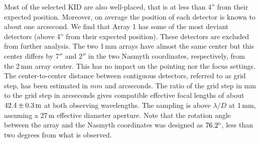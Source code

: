 Most of the selected KID are also well-placed, that is at less than 4'' from
their expected position. Moreover, on average the position of each
detector is known to about one arcsecond. We find
that Array 1 has some of the most deviant detectors (above 4''
from their expected position). These detectors are excluded from
further analysis. The two 1\,mm arrays have almost
the same center but this center differs by $7''$ and $2''$ in the two Nasmyth
coordinates, respectively, from the 2\,mm array center. This has no impact on the
pointing nor the focus settings. {\lp The center-to-center distance between
contiguous detectors, referred to as grid step, has been estimated in
$mm$ and arcseconds. The ratio of the grid step in mm to
the grid step in arcseconds gives compatible effective focal lengths
of about $42.4\pm0.3\,\rm{m}$ at both observing wavelengths.} The sampling is above $\lambda/D$ at
1\,mm, assuming a 27\,m effective diameter aperture. Note that
the rotation angle between the array and the Nasmyth
coordinates was designed as $76.2^{\rm{o}}$, less than two degrees from
what is observed.


